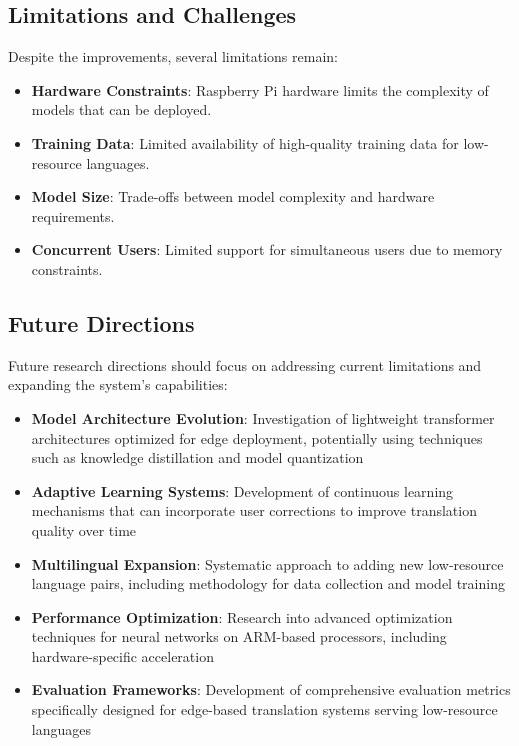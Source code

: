 \documentclass[conference]{IEEEtran}
\begin{document}
\subsection{Limitations and Challenges}

Despite the improvements, several limitations remain:

\begin{itemize}
    \item \textbf{Hardware Constraints}: Raspberry Pi hardware limits the complexity of models that can be deployed.
    \item \textbf{Training Data}: Limited availability of high-quality training data for low-resource languages.
    \item \textbf{Model Size}: Trade-offs between model complexity and hardware requirements.
    \item \textbf{Concurrent Users}: Limited support for simultaneous users due to memory constraints.
\end{itemize}

\subsection{Future Directions}

Future research directions should focus on addressing current limitations and expanding the system's capabilities:

\begin{itemize}
    \item \textbf{Model Architecture Evolution}: Investigation of lightweight transformer architectures optimized for edge deployment, potentially using techniques such as knowledge distillation and model quantization
    \item \textbf{Adaptive Learning Systems}: Development of continuous learning mechanisms that can incorporate user corrections to improve translation quality over time
    \item \textbf{Multilingual Expansion}: Systematic approach to adding new low-resource language pairs, including methodology for data collection and model training
    \item \textbf{Performance Optimization}: Research into advanced optimization techniques for neural networks on ARM-based processors, including hardware-specific acceleration
    \item \textbf{Evaluation Frameworks}: Development of comprehensive evaluation metrics specifically designed for edge-based translation systems serving low-resource languages
\end{itemize}
\end{document}
